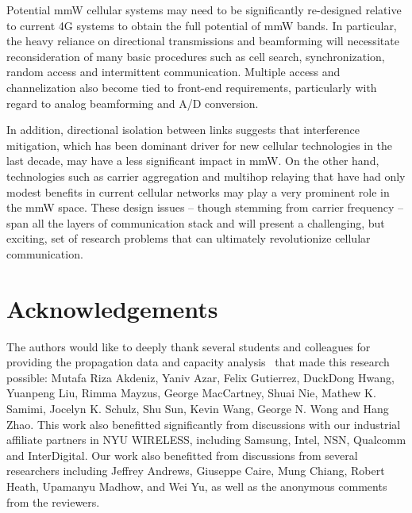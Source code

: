 \documentclass[journal]{IEEEtran}
\begin{document}
Potential mmW cellular systems may need to
be significantly re-designed relative to
current 4G systems to obtain the full potential
of mmW bands.  In particular,
the heavy reliance on directional transmissions and beamforming
will necessitate reconsideration of many basic procedures such as
cell search, synchronization, random access and intermittent communication.
Multiple access and channelization also become tied to front-end requirements,
particularly with regard to analog beamforming and A/D conversion.

In addition, directional isolation between links suggests that interference
mitigation, which has been dominant driver for new cellular technologies
in the last decade, may have a less significant impact in mmW.  On the other hand,
technologies such as carrier aggregation and multihop relaying that have
had only modest benefits in current cellular networks may play a very prominent
role in the mmW space.
These design issues -- though stemming from carrier frequency -- span all
the layers
of communication stack and will present a challenging, but exciting, set of
research problems that can ultimately revolutionize cellular communication.

\section*{Acknowledgements}
The authors would like to deeply thank several students and colleagues
for providing the propagation data
\cite{Rappaport:12-28G,Rappaport:28NYCPenetrationLoss,Samimi:AoAD,rappaportmillimeter,Sun-Beam:13,Nie72G-PIMRC:13,Rappaport:13-BBmmW}
and capacity analysis~\cite{AkLiuRanRapEr:13-arxiv}
that made this research possible:
Mutafa Riza Akdeniz, Yaniv Azar, Felix Gutierrez, DuckDong Hwang,
Yuanpeng Liu, Rimma Mayzus, George MacCartney, Shuai Nie,
Mathew K. Samimi, Jocelyn K. Schulz,  Shu Sun, Kevin Wang,
George N. Wong and  Hang Zhao.
This work also benefitted significantly from discussions with our
industrial affiliate partners in NYU WIRELESS, including Samsung, Intel, NSN, Qualcomm
and InterDigital.
Our work also benefitted from discussions from several researchers
including Jeffrey Andrews, Giuseppe Caire, Mung Chiang, Robert Heath, Upamanyu Madhow,
and Wei Yu, as well as the anonymous comments from the reviewers.



\end{document}

